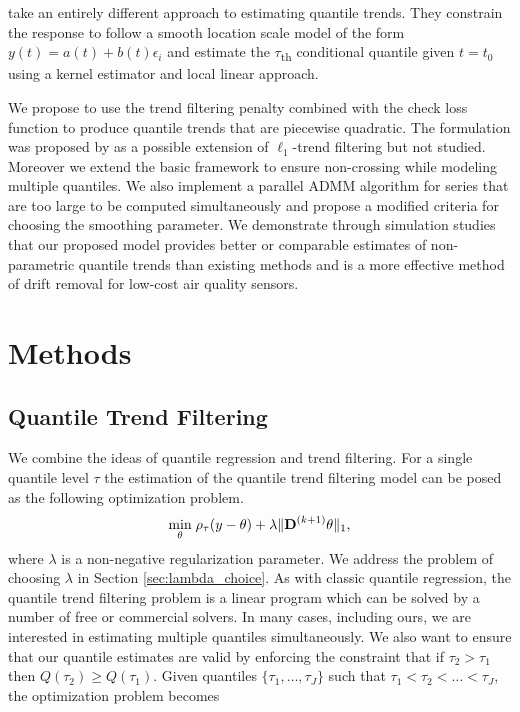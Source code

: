 \documentclass[12pt]{article}
\newcommand{\M}[1]{{\bm{\mathbf{\MakeUppercase{#1}}}}} %
\newcommand{\Mn}[2]{\M{#1}^{(#2)}} %
\begin{document}
	\cite{Racine2017} take an entirely different approach to estimating quantile trends. They constrain the response to follow a smooth location scale model of the form $y(t) = a(t) + b(t)\epsilon_i$ and estimate the $\tau$\textsubscript{th} conditional quantile given $t = t_0$ using a kernel estimator and local linear approach. 

	We propose to use the trend filtering penalty combined with the check loss function to produce quantile trends that are piecewise quadratic. The formulation was proposed by \cite{Kim2009} as a possible extension of $\ell_1$-trend filtering but not studied. Moreover we extend the basic framework to ensure non-crossing while modeling multiple quantiles. We also implement a parallel ADMM algorithm for series that are too large to be computed simultaneously and propose a modified criteria for choosing the smoothing parameter. We demonstrate through simulation studies that our proposed model provides better or comparable estimates of non-parametric quantile trends than existing methods and is a more effective method of drift removal for low-cost air quality sensors. 
	

	\section{Methods}
	
	\subsection{Quantile Trend Filtering}
	
	We combine the ideas of quantile regression and trend filtering. For a single quantile level $\tau$ the estimation of the quantile trend filtering model can be posed as the following optimization problem.
	\begin{eqnarray}
	\label{eq:quantile_trend}
	\underset{\theta}{\min}\; \rho_\tau(y - \theta) + \lambda \lVert \Mn{D}{k+1} \theta \rVert_1,
	\end{eqnarray}
	where $\lambda$ is a non-negative regularization parameter. We address the problem of choosing $\lambda$ in Section \ref{sec:lambda_choice}. As with classic quantile regression, the quantile trend filtering problem is a linear program which can be solved by a number of free or commercial solvers. In many cases, including ours, we are interested in estimating multiple quantiles simultaneously. We also want to ensure that our quantile estimates are valid by enforcing the constraint that if $\tau_2 > \tau_1$ then $Q(\tau_2) \ge Q(\tau_1)$. Given quantiles $\{\tau_1, \ldots, \tau_J\}$ such that $\tau_1 < \tau_2 < \ldots < \tau_J$, the optimization problem becomes 
	
\end{document}
